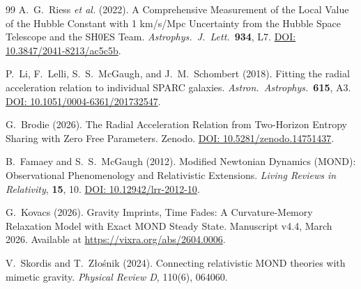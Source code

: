 \documentclass[aps,prd,twocolumn,superscriptaddress,nofootinbib]{revtex4-2}
\begin{document}
\begin{thebibliography}{99}
A.~G.~Riess \textit{et al.} (2022).
A Comprehensive Measurement of the Local Value of the Hubble Constant with 1 km/s/Mpc Uncertainty from the Hubble Space Telescope and the SH0ES Team.
\textit{Astrophys.\ J.\ Lett.}\ \textbf{934}, L7.
\href{https://doi.org/10.3847/2041-8213/ac5c5b}{DOI: 10.3847/2041-8213/ac5c5b}.

P.~Li, F.~Lelli, S.~S.~McGaugh, and J.~M.~Schombert (2018).
Fitting the radial acceleration relation to individual SPARC galaxies.
\textit{Astron.\ Astrophys.}\ \textbf{615}, A3.
\href{https://doi.org/10.1051/0004-6361/201732547}{DOI: 10.1051/0004-6361/201732547}.

G.~Brodie (2026).
The Radial Acceleration Relation from Two-Horizon Entropy Sharing with Zero Free Parameters.
Zenodo. \href{https://doi.org/10.5281/zenodo.14751437}{DOI: 10.5281/zenodo.14751437}.

B.~Famaey and S.~S.~McGaugh (2012).
Modified Newtonian Dynamics (MOND): Observational Phenomenology and Relativistic Extensions.
\textit{Living Reviews in Relativity}, \textbf{15}, 10.
\href{https://doi.org/10.12942/lrr-2012-10}{DOI: 10.12942/lrr-2012-10}.

G.~Kovacs (2026).
Gravity Imprints, Time Fades: A Curvature-Memory Relaxation Model with Exact MOND Steady State.
Manuscript v4.4, March 2026.
Available at \url{https://vixra.org/abs/2604.0006}.

V.~Skordis and T.~Z{\l}o\'snik (2024).
Connecting relativistic MOND theories with mimetic gravity.
\textit{Physical Review D}, 110(6), 064060.

\end{thebibliography}
\end{document}
